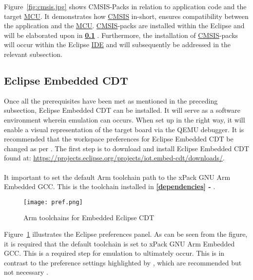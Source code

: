 Figure~\ref{fig:cmsis.jpg} shows CMSIS-Packs in relation to application code and the target \hyperref[listAbr]{MCU}. It demonstrates how \hyperref[listAbr]{CMSIS} in-short, ensures compatibility between the application and the \hyperref[listAbr]{MCU}. \hyperref[listAbr]{CMSIS}-packs are installed within the Eclipse and will be elaborated upon in \textbf{\ref{eclipse} }. Furthermore, the installation of \hyperref[listAbr]{CMSIS}-packs will occur within the Eclipse \hyperref[listAbr]{IDE} and will subsequently be addressed in the relevant subsection.   
\subsection{Eclipse Embedded CDT}
\label{eclipse}
Once all the prerequisites have been met as mentioned in the preceding subsection, Eclipse Embedded CDT can be installed. It will serve as a software environment wherein emulation can  occurs. When set up in the right way, it will enable a visual representation of the target board via the QEMU debugger. It is recommended that the workspace preferences for Eclipse Embedded CDT be changed as per \textbf{}. The first step is to download and install Eclipse Embedded CDT found at: \color{blue}\url{https://projects.eclipse.org/projects/iot.embed-cdt/downloads/}\color{black}.
\\\\
It important to set the default Arm toolchain path to the xPack GNU Arm Embedded GCC. This is the toolchain installed in \textbf{\ref{dependencies}  -  }.
\begin{figure}[H]
\begin{center}
\texttt{[image: pref.png]}
\caption{Arm toolchains for Embedded Eclipse CDT}
\label{fig:prefArm.jpg}
\end{center}
\end{figure}

Figure~\ref{fig:prefArm.jpg} illustrates the Eclipse preferences panel. As can be seen from the figure, it is required that the default toolchain is set to xPack GNU Arm Embedded GCC. This is a required step for emulation to ultimately occur. This is in contrast to the preference settings highlighted by \textbf{}, which are recommended but not necessary \cite{eclipseGuide}.

